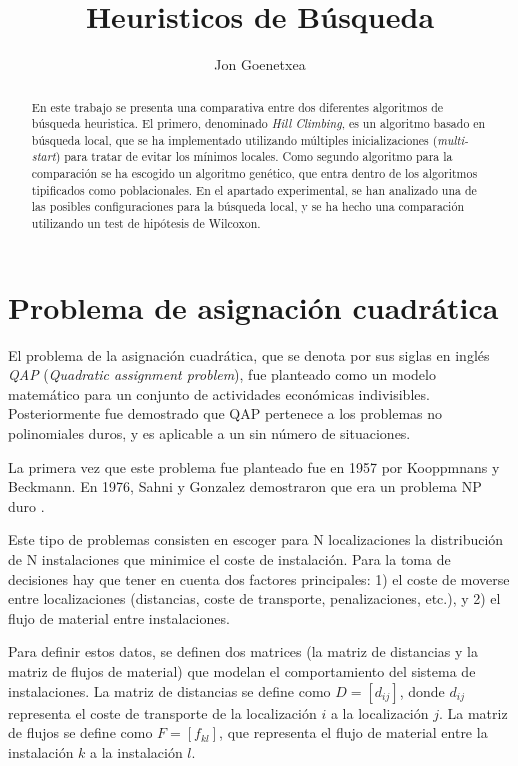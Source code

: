 \documentclass[10pt,a4paper]{article}
\author{Jon Goenetxea}
\title{Heuristicos de Búsqueda}
\begin{document}
\maketitle

\begin{abstract}
En este trabajo se presenta una comparativa entre dos diferentes algoritmos de búsqueda heuristica. El primero, denominado \textit{Hill Climbing}, es un algoritmo basado en búsqueda local, que se ha implementado utilizando múltiples inicializaciones (\textit{multi-start}) para tratar de evitar los mínimos locales. Como segundo algoritmo para la comparación se ha escogido un algoritmo genético, que entra dentro de los algoritmos tipificados como poblacionales. En el apartado experimental, se han analizado una de las posibles configuraciones para la búsqueda local, y se ha hecho una comparación utilizando un test de hipótesis de Wilcoxon.
\end{abstract}

\section{Problema de asignación cuadrática}
\label{sec:planteamiento}
El problema de la asignación cuadrática, que se denota por sus siglas en inglés \textit{QAP} (\textit{Quadratic assignment problem}), fue planteado como un modelo matemático para un conjunto de actividades económicas indivisibles. Posteriormente fue demostrado que QAP pertenece a los problemas no polinomiales duros, y es aplicable a un sin número de situaciones.

La primera vez que este problema fue planteado fue en 1957 por Kooppmnans y Beckmann. En 1976, Sahni y Gonzalez demostraron que era un problema NP duro 
.

Este tipo de problemas consisten en escoger para N localizaciones la distribución de N instalaciones que minimice el coste de instalación. Para la toma de decisiones hay que tener en cuenta dos factores principales: 1) el coste de moverse entre localizaciones (distancias, coste de transporte, penalizaciones, etc.), y 2) el flujo de material entre instalaciones.

Para definir estos datos, se definen dos matrices (la matriz de distancias y la matriz de flujos de material) que modelan el comportamiento del sistema de instalaciones. La matriz de distancias se define como $D=[d_{ij}]$, donde $d_{ij}$ representa el coste de transporte de la localización $i$ a la localización $j$. La matriz de flujos se define como $F=[f_{kl}]$, que representa el flujo de material entre la instalación $k$ a la instalación $l$.
\end{document}
